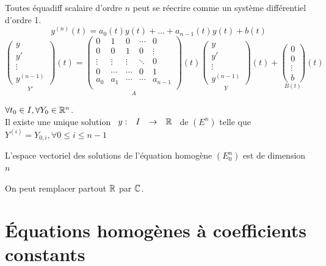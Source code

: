 \documentclass[]{report}
\begin{document}
\begin{ra}
    Toutes équadiff scalaire d'ordre $n$ peut se réecrire comme un système différentiel d'ordre 1.
    \[y^{(n)}(t)=a_0(t)y(t)+\ldots+a_{n-1}(t)y(t)+b(t)\]
    \[\underset{Y'}{\begin{pmatrix}
        y\\
        y'\\
        \vdots\\
        y^{(n-1)}
    \end{pmatrix}}(t)=\underset{A}{\begin{pmatrix}
        0&1&0&\cdots&0\\
        0&0&1&0&\vdots \\
        \vdots&\vdots&\vdots&\ddots&0 \\
        0&\cdots&\cdots&0&1 \\
        a_0&a_1&\cdots&\cdots&a_{n-1} \\
    \end{pmatrix}}(t)\underset{Y}{\begin{pmatrix}
        y\\
        y'\\
        \vdots\\
        y^{(n-1)}
    \end{pmatrix}}(t)+\underset{B(t)}{\begin{pmatrix}
        0\\
        0\\
        \vdots\\
        b
    \end{pmatrix}}(t)\]
\end{ra}

\begin{cor}
    $\forall t_0\in I,\forall Y_0\in \mathbb{R}^n$.\\
    Il existe une unique solution $\begin{array}{ccccc} y : & I & \to & \mathbb{R} \end{array}$ de $(E^n)$ telle que $Y^{(i)}=Y_{0,i},\forall 0\le i\le n-1$
\end{cor}

\begin{cor}
    L'espace vectoriel des solutions de l'équation homogène $(E_0^n)$ est de dimension $n$
\end{cor}

\begin{re}
    On peut remplacer partout $\mathbb{R}$ par $\mathbb{C}$.
\end{re}

\section{Équations homogènes à coefficients constants}
\end{document}
